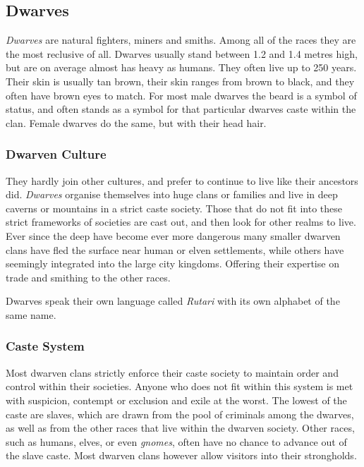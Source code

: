 \subsection{Dwarves}
\label{sec:Dwarves}

\emph{Dwarves} are natural fighters, miners and smiths. Among all of the races
they are the most reclusive of all. Dwarves usually stand between 1.2 and 1.4
metres high, but are on average almost has heavy as humans. They often live
up to 250 years. Their skin is usually tan brown, their skin ranges from brown
to black, and they often have brown eyes to match. For most male dwarves the
beard is a symbol of status, and often stands as a symbol for that particular
dwarves caste within the clan. Female dwarves do the same, but with their
head hair.

\subsubsection*{Dwarven Culture}

They hardly join other cultures, and prefer to continue to live like their
ancestors did. \emph{Dwarves} organise themselves into huge clans or families
and live in deep caverns or mountains in a strict caste society. Those that do
not fit into these strict frameworks of societies are cast out, and then look
for other realms to live. Ever since the deep have become ever more dangerous
many smaller dwarven clans have fled the surface near human or elven
settlements, while others have seemingly integrated into the large city
kingdoms. Offering their expertise on trade and smithing to the other races.

Dwarves speak their own language called \emph{Rutari} with its own alphabet of
the same name.

\subsubsection*{Caste System}

Most dwarven clans strictly enforce their caste society to maintain order and
control within their societies. Anyone who does not fit within this system is
met with suspicion, contempt or exclusion and exile at the worst. The lowest
of the caste are slaves, which are drawn from the pool of criminals among the
dwarves, as well as from the other races that live within the dwarven society.
Other races, such as humans, elves, or even \emph{gnomes}, often have no chance
to advance out of the slave caste. Most dwarven clans however allow visitors
into their strongholds.

